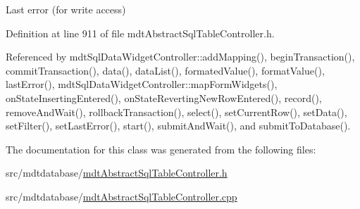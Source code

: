 Last error (for write access) 



Definition at line 911 of file mdt\-Abstract\-Sql\-Table\-Controller.\-h.



Referenced by mdt\-Sql\-Data\-Widget\-Controller\-::add\-Mapping(), begin\-Transaction(), commit\-Transaction(), data(), data\-List(), formated\-Value(), format\-Value(), last\-Error(), mdt\-Sql\-Data\-Widget\-Controller\-::map\-Form\-Widgets(), on\-State\-Inserting\-Entered(), on\-State\-Reverting\-New\-Row\-Entered(), record(), remove\-And\-Wait(), rollback\-Transaction(), select(), set\-Current\-Row(), set\-Data(), set\-Filter(), set\-Last\-Error(), start(), submit\-And\-Wait(), and submit\-To\-Database().



The documentation for this class was generated from the following files\-:\begin{DoxyCompactItemize}
\item 
src/mdtdatabase/\hyperlink{mdt_abstract_sql_table_controller_8h}{mdt\-Abstract\-Sql\-Table\-Controller.\-h}\item 
src/mdtdatabase/\hyperlink{mdt_abstract_sql_table_controller_8cpp}{mdt\-Abstract\-Sql\-Table\-Controller.\-cpp}\end{DoxyCompactItemize}
